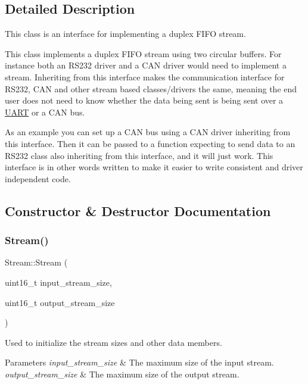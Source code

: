 \subsection{Detailed Description}
This class is an interface for implementing a duplex F\+I\+FO stream.

This class implements a duplex F\+I\+FO stream using two circular buffers. For instance both an R\+S232 driver and a C\+AN driver would need to implement a stream. Inheriting from this interface makes the communication interface for R\+S232, C\+AN and other stream based classes/drivers the same, meaning the end user does not need to know whether the data being sent is being sent over a \hyperlink{class_u_a_r_t}{U\+A\+RT} or a C\+AN bus.

As an example you can set up a C\+AN bus using a C\+AN driver inheriting from this interface. Then it can be passed to a function expecting to send data to an R\+S232 class also inheriting from this interface, and it will just work. This interface is in other words written to make it easier to write consistent and driver independent code. 

\subsection{Constructor \& Destructor Documentation}
\hypertarget{class_stream_a2b738d6f4d3059de2ae3d444d68663bf}{}\label{class_stream_a2b738d6f4d3059de2ae3d444d68663bf} 
\subsubsection{\texorpdfstring{Stream()}{Stream()}}
{\footnotesize\ttfamily Stream\+::\+Stream (\begin{DoxyParamCaption}\item[{uint16\+\_\+t}]{input\+\_\+stream\+\_\+size,  }\item[{uint16\+\_\+t}]{output\+\_\+stream\+\_\+size }\end{DoxyParamCaption})}

Used to initialize the stream sizes and other data members. 
\begin{DoxyParams}{Parameters}
{\em input\+\_\+stream\+\_\+size} & The maximum size of the input stream. \\
\hline
{\em output\+\_\+stream\+\_\+size} & The maximum size of the output stream. \\
\hline
\end{DoxyParams}


